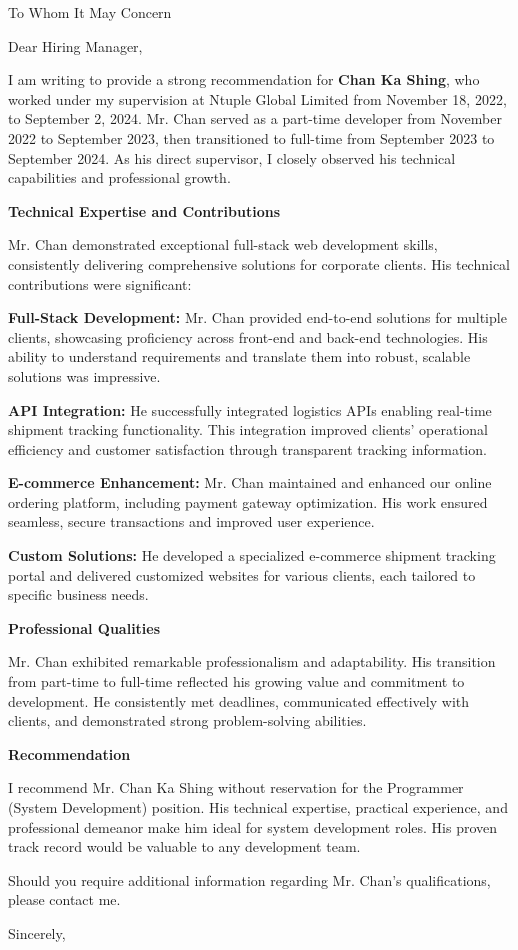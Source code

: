 \documentclass[11pt,a4paper]{letter}
\date{September 1, 2024}
\makeatletter
\renewcommand*{\opening}[1]{\ifx\@empty\fromaddress
  \thispagestyle{firstpage}%
    {\raggedleft\@date\par}%
  \else  %
    \thispagestyle{empty}%
    {\noindent\fromaddress \par}%
    {\raggedleft\@date\par}%
  \fi
  \vspace{1\parskip}%
  {\raggedright \toname \par}%
  {\raggedright \toaddress \par}%
  \vspace{1\parskip}%
  #1\par\nobreak}
\makeatother
\begin{document}
\begin{letter}{To Whom It May Concern}

\opening{Dear Hiring Manager,}


I am writing to provide a strong recommendation for \textbf{Chan Ka Shing}, who worked under my supervision at Ntuple Global Limited from November 18, 2022, to September 2, 2024. Mr. Chan served as a part-time developer from November 2022 to September 2023, then transitioned to full-time from September 2023 to September 2024. As his direct supervisor, I closely observed his technical capabilities and professional growth.

\textbf{Technical Expertise and Contributions}

Mr. Chan demonstrated exceptional full-stack web development skills, consistently delivering comprehensive solutions for corporate clients. His technical contributions were significant:

\textbf{Full-Stack Development:} Mr. Chan provided end-to-end solutions for multiple clients, showcasing proficiency across front-end and back-end technologies. His ability to understand requirements and translate them into robust, scalable solutions was impressive.

\textbf{API Integration:} He successfully integrated logistics APIs enabling real-time shipment tracking functionality. This integration improved clients' operational efficiency and customer satisfaction through transparent tracking information.

\textbf{E-commerce Enhancement:} Mr. Chan maintained and enhanced our online ordering platform, including payment gateway optimization. His work ensured seamless, secure transactions and improved user experience.

\textbf{Custom Solutions:} He developed a specialized e-commerce shipment tracking portal and delivered customized websites for various clients, each tailored to specific business needs.

\textbf{Professional Qualities}

Mr. Chan exhibited remarkable professionalism and adaptability. His transition from part-time to full-time reflected his growing value and commitment to development. He consistently met deadlines, communicated effectively with clients, and demonstrated strong problem-solving abilities.

\textbf{Recommendation}

I recommend Mr. Chan Ka Shing without reservation for the Programmer (System Development) position. His technical expertise, practical experience, and professional demeanor make him ideal for system development roles. His proven track record would be valuable to any development team.

Should you require additional information regarding Mr. Chan's qualifications, please contact me.

\closing{Sincerely,}

\end{letter}
\end{document}
